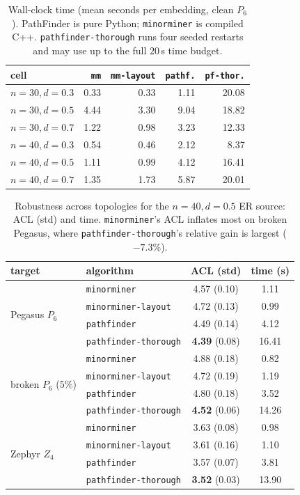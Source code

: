 \documentclass[acmsmall,anonymous,nonacm]{acmart}
\begin{document}
\begin{table}[t]
\caption{Wall-clock time (mean seconds per embedding, clean $P_6$). PathFinder
is pure Python; \texttt{minorminer} is compiled C++. \texttt{pathfinder-thorough}
runs four seeded restarts and may use up to the full $20$\,s time budget.}
\label{tab:timing}
\small
\begin{tabular}{lrrrr}
\toprule
cell & \texttt{mm} & \texttt{mm-layout} & \texttt{pathf.} & \texttt{pf-thor.} \\
\midrule
$n{=}30,d{=}0.3$ & 0.33 & 0.33 & 1.11 & 20.08 \\
$n{=}30,d{=}0.5$ & 4.44 & 3.30 & 9.04 & 18.82 \\
$n{=}30,d{=}0.7$ & 1.22 & 0.98 & 3.23 & 12.33 \\
$n{=}40,d{=}0.3$ & 0.54 & 0.46 & 2.12 & 8.37 \\
$n{=}40,d{=}0.5$ & 1.11 & 0.99 & 4.12 & 16.41 \\
$n{=}40,d{=}0.7$ & 1.35 & 1.73 & 5.87 & 20.01 \\
\bottomrule
\end{tabular}
\end{table}

\begin{table}[t]
\caption{Robustness across topologies for the $n{=}40,d{=}0.5$ ER source: ACL
(std) and time. \texttt{minorminer}'s ACL inflates most on broken Pegasus, where
\texttt{pathfinder-thorough}'s relative gain is largest ($-7.3\%$).}
\label{tab:robust}
\small
\begin{tabular}{llcc}
\toprule
target & algorithm & ACL (std) & time (s) \\
\midrule
\multirow{4}{*}{Pegasus $P_6$}
 & \texttt{minorminer}          & 4.57 (0.10) & 1.11 \\
 & \texttt{minorminer-layout}   & 4.72 (0.13) & 0.99 \\
 & \texttt{pathfinder}          & 4.49 (0.14) & 4.12 \\
 & \texttt{pathfinder-thorough} & \textbf{4.39} (0.08) & 16.41 \\
\midrule
\multirow{4}{*}{broken $P_6$ ($5\%$)}
 & \texttt{minorminer}          & 4.88 (0.18) & 0.82 \\
 & \texttt{minorminer-layout}   & 4.72 (0.19) & 1.19 \\
 & \texttt{pathfinder}          & 4.80 (0.18) & 3.52 \\
 & \texttt{pathfinder-thorough} & \textbf{4.52} (0.06) & 14.26 \\
\midrule
\multirow{4}{*}{Zephyr $Z_4$}
 & \texttt{minorminer}          & 3.63 (0.08) & 0.98 \\
 & \texttt{minorminer-layout}   & 3.61 (0.16) & 1.10 \\
 & \texttt{pathfinder}          & 3.57 (0.07) & 3.81 \\
 & \texttt{pathfinder-thorough} & \textbf{3.52} (0.03) & 13.90 \\
\bottomrule
\end{tabular}
\end{table}
\end{document}
